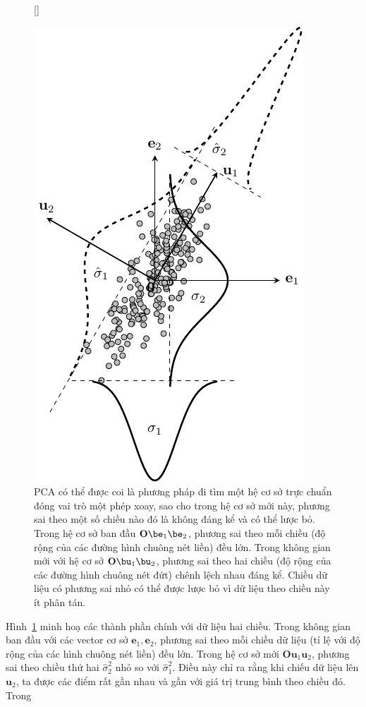 \begin{figure}[t]
   
   
    [\FBwidth]
    {\caption{ PCA có thể được coi là phương pháp đi tìm một hệ cơ sở trực chuẩn
    đóng vai trò một phép xoay, sao cho trong hệ cơ sở mới này, phương sai theo
    một số chiều nào đó là không đáng kể và có thể lược bỏ. Trong hệ cơ sở ban đầu
    $\mathbf{O}\be_1\be_2$, phương sai theo mỗi chiều (độ rộng của các đường
    hình chuông nét liền) đều lớn. Trong không gian mới với hệ cơ sở
    $\mathbf{O}\bu_1\bu_2$, phương sai theo hai chiều (độ rộng của các đường
    hình chuông nét đứt) chênh lệch nhau đáng kể. Chiều dữ liệu có phương sai nhỏ
    có thể được lược bỏ vì dữ liệu theo chiều này ít phân tán. }
    \label{fig:27_4}}
    { %
   
    \includegraphics[width=.4\textwidth]{Chapters/07_DimemsionalityReduction/27_pca/latex/pca_var.pdf}
    }
\end{figure}
Hình~\ref{fig:27_4} minh hoạ các thành phần chính với dữ liệu hai chiều.
Trong không gian ban đầu với các vector cơ sở $\mathbf{e}_1,
\mathbf{e}_2$, phương sai theo mỗi chiều dữ liệu (tỉ lệ với độ rộng của các hình chuông
nét liền) đều lớn. Trong hệ cơ sở mới $\mathbf{O}\mathbf{u}_1\mathbf{u}_2$,
phương sai theo chiều thứ hai $\hat{\sigma}_2^2$ nhỏ so với
$\hat{\sigma}_1^2$. Điều này chỉ ra rằng khi chiếu dữ liệu lên $\mathbf{u}_2$, ta
được các điểm rất gần nhau và gần với giá trị trung bình theo chiều đó. Trong
